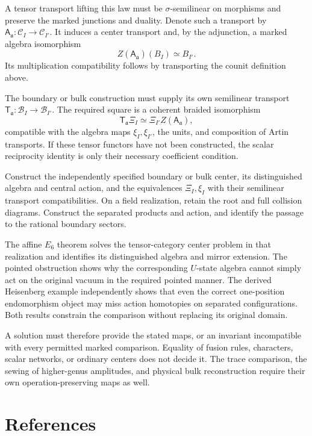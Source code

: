 A tensor transport lifting this law must be
$\sigma$-semilinear on morphisms and preserve the
marked junctions and duality.
Denote such a transport by
$\mathsf A_{\mathfrak a}:\mathcal C_I\to\mathcal C_{I'}$.
It induces a center transport and, by the adjunction,
a marked algebra isomorphism
\[
 Z(\mathsf A_{\mathfrak a})(B_I)\simeq B_{I'}.
\]
Its multiplication compatibility follows by transporting
the counit definition above.

The boundary or bulk construction must supply its own
semilinear transport
$\mathsf T_{\mathfrak a}:\mathcal B_I\to\mathcal B_{I'}$.
The required square is a coherent braided isomorphism
\[
 \mathsf T_{\mathfrak a}\Xi_I
 \simeq
 \Xi_{I'}Z(\mathsf A_{\mathfrak a}),
\]
compatible with the algebra maps $\xi_I,\xi_{I'}$,
the units, and composition of Artin transports.
If these tensor functors have not been constructed,
the scalar reciprocity identity is only their necessary
coefficient condition.

\begin{question}
\label{v4-arith:centers:qn:arithmetic}
Construct the independently specified boundary or bulk
center, its distinguished algebra and central action,
and the equivalences $\Xi_I,\xi_I$ with their semilinear
transport compatibilities. On a field realization, retain the root and full collision
diagrams. Construct the separated products and action,
and identify the passage to the rational boundary sectors.
\end{question}

The affine $E_6$ theorem solves the tensor-category
center problem in that realization and identifies its
distinguished algebra and mirror extension.
The pointed obstruction shows why the corresponding
$U$-state algebra cannot simply act on the original
vacuum in the required pointed manner.
The derived Heisenberg example independently shows that
even the correct one-position endomorphism object may
miss action homotopies on separated configurations.
Both results constrain the comparison without replacing
its original domain.

A solution must therefore provide the stated maps,
or an invariant incompatible with every permitted
marked comparison. Equality of fusion rules, characters,
scalar networks, or ordinary centers does not decide it.
The trace comparison, the sewing of higher-genus
amplitudes, and physical bulk reconstruction require
their own operation-preserving maps as well.

\section*{References}

